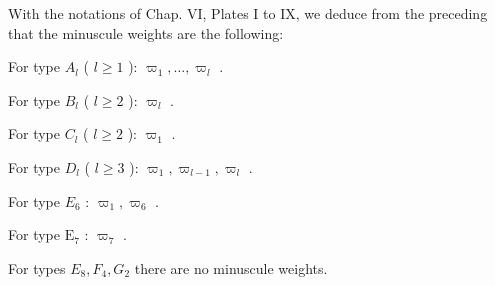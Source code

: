 With the notations of Chap. VI, Plates I to IX, we deduce from the preceding that the minuscule weights are the following:

For type \(A_{l}\) ( \(l \geq 1\) ): \(\varpi_{1}, \ldots, \varpi_{l}\) .

For type \(B_{l}\) ( \(l \geq 2\) ): \(\varpi_{l}\) .

For type \(C_{l}\) ( \(l \geq 2\) ): \(\varpi_{1}\) .

For type \(D_{l}\) ( \(l \geq 3\) ): \(\varpi_{1}, \varpi_{l-1}, \varpi_{l}\) .

For type \(E_{6}\) : \(\varpi_{1}, \varpi_{6}\) .

For type \(\mathrm{E}_7\) : \(\varpi_7\) .

For types \(E_{8}, F_{4}, G_{2}\) there are no minuscule weights.

